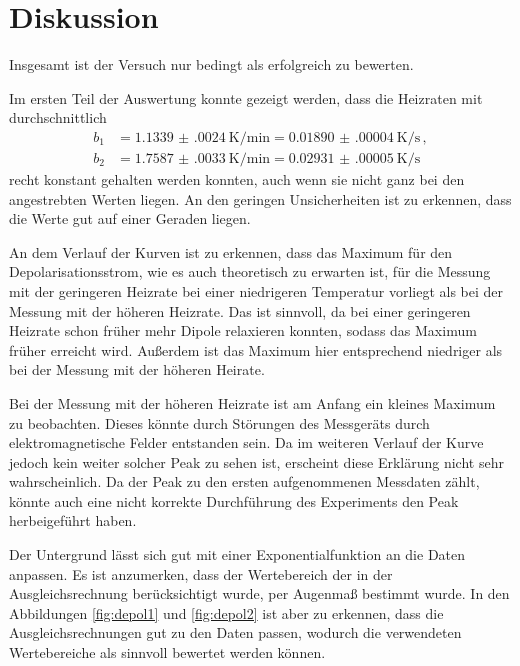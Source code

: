 \newpage
\section{Diskussion}
\label{sec:Diskussion}

Insgesamt ist der Versuch nur bedingt als erfolgreich zu bewerten.

Im ersten Teil der Auswertung konnte gezeigt werden, dass die Heizraten mit
durchschnittlich
\begin{align*}
  b_1&=\SI{1.1339(0024)}{\kelvin\per\minute}= \SI{0.01890(00004)}{\kelvin\per\second}\,, \\
  b_2&=\SI{1.7587(0033)}{\kelvin\per\minute}= \SI{0.02931(00005)}{\kelvin\per\second}\,
\end{align*}
recht konstant gehalten werden konnten, auch wenn sie nicht ganz bei den angestrebten
Werten liegen. An den geringen Unsicherheiten ist zu erkennen, dass die Werte gut auf einer
Geraden liegen.

An dem Verlauf der Kurven ist zu erkennen, dass das Maximum für den Depolarisationsstrom,
wie es auch theoretisch zu erwarten ist, für die Messung mit der geringeren Heizrate bei
einer niedrigeren Temperatur vorliegt als bei der Messung mit der höheren Heizrate. Das ist
sinnvoll, da bei einer geringeren Heizrate schon früher mehr Dipole relaxieren konnten, sodass
das Maximum früher erreicht wird. Außerdem ist das Maximum hier entsprechend niedriger als
bei der Messung mit der höheren Heirate.

Bei der Messung mit der höheren Heizrate ist am Anfang ein kleines Maximum zu
beobachten. Dieses könnte durch Störungen des Messgeräts durch elektromagnetische Felder
entstanden sein. Da im weiteren Verlauf der Kurve jedoch kein weiter solcher Peak
zu sehen ist, erscheint diese Erklärung nicht sehr wahrscheinlich. Da der Peak zu den
ersten aufgenommenen Messdaten zählt, könnte auch eine nicht korrekte Durchführung des
Experiments den Peak herbeigeführt haben. 

Der Untergrund lässt sich gut mit einer Exponentialfunktion an die Daten anpassen.
Es ist anzumerken, dass der Wertebereich der in der Ausgleichsrechnung berücksichtigt wurde,
per Augenmaß bestimmt wurde. In den
Abbildungen \ref{fig:depol1} und \ref{fig:depol2} ist aber zu erkennen, dass die Ausgleichsrechnungen
gut zu den Daten passen, wodurch die verwendeten Wertebereiche als sinnvoll bewertet werden können.


